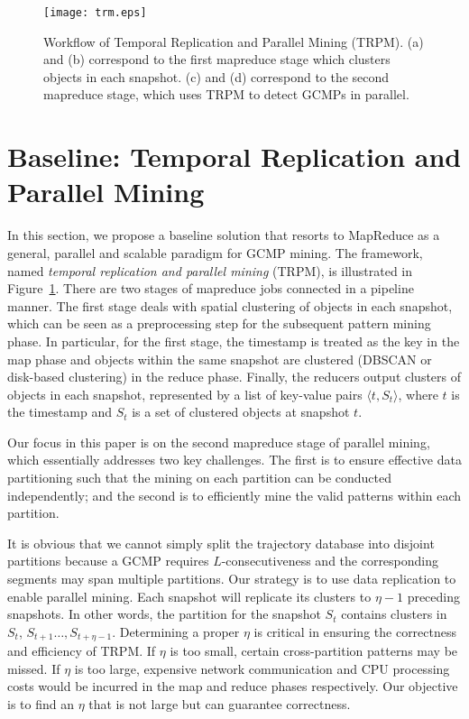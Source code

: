 \begin{figure} [t]
\center
\texttt{[image: trm.eps]}
    \vspace{-0.5em}
\caption{Workflow of Temporal Replication and Parallel Mining (TRPM). (a) and (b) correspond to the first mapreduce stage which clusters objects in each snapshot.  (c) and (d) correspond to the second mapreduce stage, which uses TRPM to detect GCMPs in parallel.}
\vspace{-0.5em}
\label{fig:trm}
\end{figure}

\section{Baseline: Temporal Replication and Parallel Mining}
\label{sec:trm}
In this section, we propose a baseline solution that resorts to MapReduce as a general, parallel and scalable paradigm for GCMP mining. The framework, named \textit{temporal replication and parallel mining} (TRPM), is illustrated in   Figure~\ref{fig:trm}. There are two stages of mapreduce jobs connected in a pipeline manner. The first stage deals with spatial clustering of objects in each snapshot, which can be seen as a preprocessing step for the subsequent pattern mining phase. In particular, for the first stage, the timestamp is treated as the key in the map phase and objects within the same snapshot are clustered (DBSCAN or disk-based clustering) in the reduce phase. Finally, the reducers output clusters of objects in each snapshot, represented by a list of key-value pairs $\langle t, S_t  \rangle$, where $t$ is the timestamp and $S_t$ is a set of clustered objects at snapshot $t$. 

Our focus in this paper is on the second mapreduce stage of parallel mining, which essentially addresses two key challenges. The first is to ensure effective data partitioning such that the mining on each partition can be conducted independently; and the second is to efficiently mine the valid patterns within each partition. 

It is obvious that we cannot simply split the trajectory database 
into disjoint partitions because a GCMP requires $L$-consecutiveness 
and the corresponding segments may span multiple partitions. 
Our strategy is to use data replication to enable parallel mining. 
Each snapshot will replicate its clusters to $\eta-1$ preceding snapshots.
In other words, the partition for the snapshot $S_t$ contains clusters 
in $S_t$, $S_{t+1}\ldots,S_{t+\eta-1}$. 
Determining a proper $\eta$ is critical in ensuring the
correctness and efficiency of TRPM. If $\eta$ is too small, 
certain cross-partition patterns may be missed. 
If $\eta$ is too large, expensive network communication and 
CPU processing costs would be incurred in the map and reduce phases respectively. Our objective is to find an $\eta$ that is not large but can guarantee correctness.

